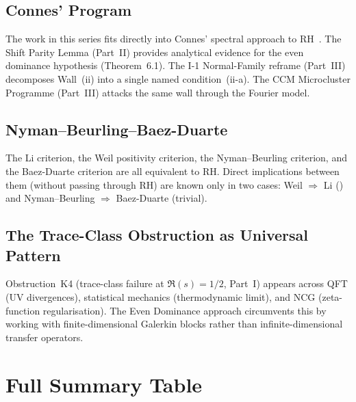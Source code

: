 \documentclass[12pt,a4paper]{article}
\theoremstyle{definition}
\theoremstyle{remark}
\begin{document}
\subsection{Connes' Program}

The work in this series fits directly into Connes' spectral approach to
RH~\cite{Connes2026}. The Shift Parity Lemma (Part~II) provides
analytical evidence for the even dominance hypothesis (Theorem~6.1). The
I-1 Normal-Family reframe (Part~III) decomposes Wall~(ii) into a single
named condition~(ii-a). The CCM Microcluster Programme (Part~III)
attacks the same wall through the Fourier model.

\subsection{Nyman--Beurling--Baez-Duarte}

The Li criterion, the Weil positivity criterion, the Nyman--Beurling
criterion, and the Baez-Duarte criterion are all equivalent to RH.
Direct implications between them (without passing through RH) are known
only in two cases: Weil $\Rightarrow$ Li
(\cite{BombieriLagarias1999}) and Nyman--Beurling $\Rightarrow$
Baez-Duarte (trivial).

\subsection{The Trace-Class Obstruction as Universal Pattern}

Obstruction~K4 (trace-class failure at $\Re(s) = 1/2$, Part~I) appears
across QFT (UV divergences), statistical mechanics (thermodynamic limit),
and NCG (zeta-function regularisation). The Even Dominance approach
circumvents this by working with finite-dimensional Galerkin blocks
rather than infinite-dimensional transfer operators.


\section{Full Summary Table}
\label{sec:full-summary}
\end{document}
